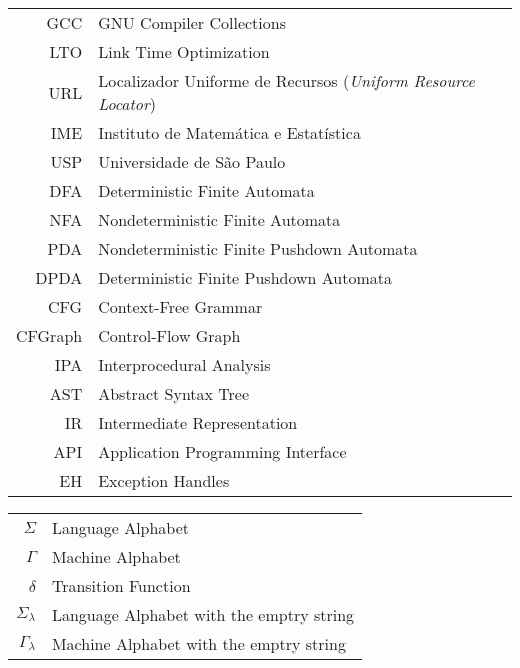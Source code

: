 \begin{tabular}{rl}
	GCC & GNU Compiler Collections \\
	LTO & Link Time Optimization \\
	URL & Localizador Uniforme de Recursos (\emph{Uniform Resource Locator})\\
	IME & Instituto de Matemática e Estatística\\
	USP & Universidade de São Paulo \\
	DFA & Deterministic Finite Automata \\
	NFA & Nondeterministic Finite Automata \\
	PDA & Nondeterministic Finite Pushdown Automata \\
	DPDA & Deterministic Finite Pushdown Automata \\
	CFG & Context-Free Grammar \\
	CFGraph & Control-Flow Graph \\
	IPA & Interprocedural Analysis \\
	AST & Abstract Syntax Tree \\
	IR  & Intermediate Representation \\
	API & Application Programming Interface \\
	EH  & Exception Handles \\

\end{tabular}


\begin{tabular}{rl}
        $\Sigma$    & Language Alphabet\\
        $\Gamma$    & Machine Alphabet\\
		$\delta$    & Transition Function\\
		$\Sigma_{\lambda}$ & Language Alphabet with the emptry string\\
		$\Gamma_{\lambda}$ & Machine Alphabet with the emptry string\\

\end{tabular}

\clearpage

